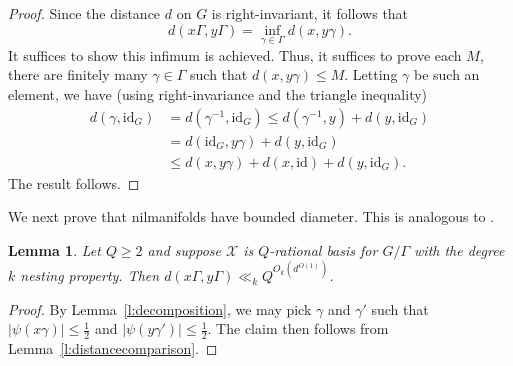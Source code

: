 \documentclass[11pt, a4paper]{amsart}
\theoremstyle{plain}
\theoremstyle{plain}
\newtheorem{lemma}{Lemma}
\theoremstyle{definition}
\theoremstyle{remark}
\numberwithin{equation}{section}
\numberwithin{lemma}{section}
\numberwithin{proposition}{section}
\numberwithin{corollary}{section}
\numberwithin{definition}{section}
\numberwithin{claim}{section}
\begin{document}
\begin{proof}
Since the distance $d$ on $G$ is right-invariant, it follows that
$$d(x\Gamma, y\Gamma) = \inf_{\gamma \in \Gamma} d(x, y\gamma).$$
It suffices to show this infimum is achieved. Thus, it suffices to prove each $M$, there are finitely many $\gamma \in \Gamma$ such that $d(x, y\gamma) \le M$. Letting $\gamma$ be such an element, we have (using right-invariance and the triangle inequality)
\begin{align*}
d(\gamma, \mathrm{id}_G) &= d(\gamma^{-1}, \mathrm{id}_G) \le d(\gamma^{-1}, y) + d(y, \mathrm{id}_G) \\
&= d(\mathrm{id}_G, y\gamma) + d(y, \mathrm{id}_G) \\
&\le d(x, y\gamma) + d(x, \mathrm{id}) + d(y, \mathrm{id}_G).
\end{align*}
The result follows.
\end{proof}
We next prove that nilmanifolds have bounded diameter. This is analogous to \cite[Lemma A.16]{GT12}.
\begin{lemma}\label{l:bounded}
Let $Q \ge 2$ and suppose $\mathcal{X}$ is $Q$-rational basis for $G/\Gamma$ with the degree $k$ nesting property. Then $d(x\Gamma, y\Gamma) \ll_k Q^{O_k(d^{O(1)})}$.
\end{lemma}
\begin{proof}
By Lemma~\ref{l:decomposition}, we may pick $\gamma$ and $\gamma'$ such that $|\psi(x\gamma)| \le \frac{1}{2}$ and $|\psi(y\gamma')| \le \frac{1}{2}$. The claim then follows from Lemma~\ref{l:distancecomparison}.
\end{proof}
\end{document}
